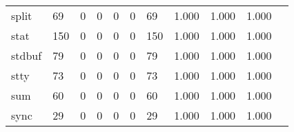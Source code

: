 \begin{longtable}{lp{1.2cm}p{1.2cm}p{1.2cm}p{1.2cm}p{1.2cm}p{1.2cm}p{1.2cm}p{1.2cm}p{1.2cm}p{1.2cm}}
split     &                                    69 &                                                  0 &                                                  0 &                                                  0 &                                                  0 &                                                 69 &                                              1.000 &                                              1.000 &                                              1.000 \\
stat      &                                   150 &                                                  0 &                                                  0 &                                                  0 &                                                  0 &                                                150 &                                              1.000 &                                              1.000 &                                              1.000 \\
stdbuf    &                                    79 &                                                  0 &                                                  0 &                                                  0 &                                                  0 &                                                 79 &                                              1.000 &                                              1.000 &                                              1.000 \\
stty      &                                    73 &                                                  0 &                                                  0 &                                                  0 &                                                  0 &                                                 73 &                                              1.000 &                                              1.000 &                                              1.000 \\
sum       &                                    60 &                                                  0 &                                                  0 &                                                  0 &                                                  0 &                                                 60 &                                              1.000 &                                              1.000 &                                              1.000 \\
sync      &                                    29 &                                                  0 &                                                  0 &                                                  0 &                                                  0 &                                                 29 &                                              1.000 &                                              1.000 &                                              1.000 \\

\end{longtable}
